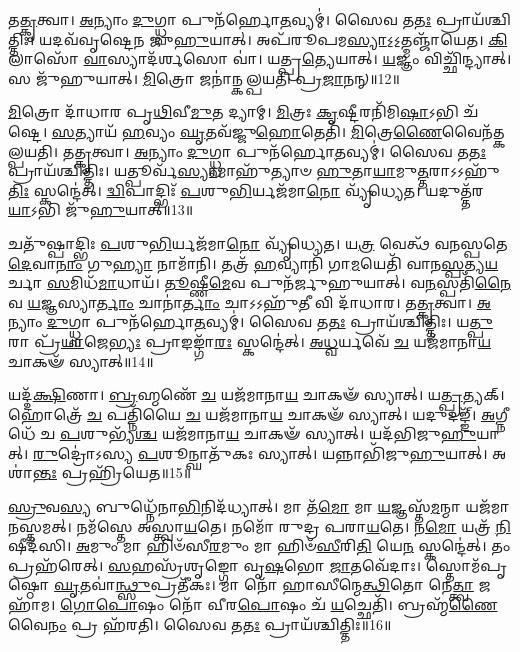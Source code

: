 𑌤\-\ul{𑌤𑍍𑌕𑍃}\-𑌤𑍍𑌵𑌾।
\-\ul{𑌅}\-𑌨𑍍𑌯𑌾𑌂 \ul{𑌦𑍁}\-𑌗𑍍𑌧𑍍𑌵𑌾 𑌪𑍁𑌨᳴𑌰𑍍\mbox{}𑌹𑍋\-\ul{𑌤}\-𑌵𑍍𑌯𑌮𑍍॑।
𑌸𑍈𑌵 𑌤\-\ul{𑌤𑌃} 𑌪𑍍𑌰𑌾𑌯᳴𑌶𑍍𑌚𑌿𑌤𑍍𑌤𑌿𑌃।
𑌯𑌦𑌵᳴𑌵𑍃𑌷𑍍𑌟𑍇𑌨 𑌜𑍁\-\ul{𑌹𑍁}\-𑌯𑌾𑌤𑍍।
𑌅𑌪᳴𑌰𑍂𑌪𑌮\-\ul{𑌸𑍍𑌯𑌾}\-𑌽॒𑌽॒𑌤𑍍𑌮𑌞𑍍𑌜𑌾᳴𑌯𑍇𑌤।
\-\ul{𑌕𑌿}\-𑌲𑌾𑌸𑍋᳴ \ul{𑌵𑌾}\-𑌸𑍍𑌯𑌾𑌦᳴𑌰𑍍\mbox{}\-\ul{𑌶}\-𑌸𑍋 𑌵𑌾॑।
𑌯𑌤𑍍𑌪𑍍𑌰\-\ul{𑌤𑍍𑌯𑍇}\-𑌯𑌾𑌤𑍍।
\-\ul{𑌯}\-𑌜𑍍𑌞𑌂 𑌵𑌿𑌚𑍍𑌛𑌿᳴𑌨𑍍𑌦𑍍𑌯𑌾𑌤𑍍।
𑌸 𑌜𑍁᳴𑌹𑍁𑌯𑌾𑌤𑍍।
\-\ul{𑌮𑌿}\-𑌤𑍍𑌰𑍋 𑌜𑌨𑌾॑𑌨𑍍𑌕𑌲𑍍𑌪𑌯𑌤𑌿 𑌪𑍍𑌰\-\ul{𑌜𑌾}\-𑌨𑌨𑍍॥12॥

\-\ul{𑌮𑌿}\-𑌤𑍍𑌰𑍋 𑌦𑌾᳴𑌧𑌾𑌰 𑌪𑍃\-\ul{𑌥𑌿}\-𑌵𑍀\-\ul{𑌮𑍁}\-𑌤 𑌦𑍍𑌯𑌾𑌮𑍍।
\-\ul{𑌮𑌿}\-𑌤𑍍𑌰𑌃 \ul{𑌕𑍃}\-𑌷𑍍𑌟𑍀𑌰𑌨𑌿᳴𑌮𑌿\-\ul{𑌷𑌾}\-𑌽𑌭𑌿 𑌚᳴𑌷𑍍𑌟𑍇।
\-\ul{𑌸}\-𑌤𑍍𑌯𑌾𑌯᳴ \ul{𑌹}\-𑌵𑍍𑌯𑌂 \ul{𑌘𑍃}\-𑌤𑌵᳴𑌜𑍍𑌜𑍁\-\ul{𑌹𑍋}\-𑌤𑍇𑌤𑌿᳴।
\-\ul{𑌮𑌿}\-𑌤𑍍𑌰𑍇\-\ul{𑌣𑍈}\-𑌵𑍈𑌨᳴𑌤𑍍𑌕𑌲𑍍𑌪𑌯𑌤𑌿।
𑌤\-\ul{𑌤𑍍𑌕𑍃}\-𑌤𑍍𑌵𑌾।
\-\ul{𑌅}\-𑌨𑍍𑌯𑌾𑌂 \ul{𑌦𑍁}\-𑌗𑍍𑌧𑍍𑌵𑌾 𑌪𑍁𑌨᳴𑌰𑍍\mbox{}𑌹𑍋\-\ul{𑌤}\-𑌵𑍍𑌯𑌮𑍍॑।
𑌸𑍈𑌵 𑌤\-\ul{𑌤𑌃} 𑌪𑍍𑌰𑌾𑌯᳴𑌶𑍍𑌚𑌿𑌤𑍍𑌤𑌿𑌃।
𑌯𑌤𑍍𑌪𑍂𑌰𑍍𑌵᳴\-\ul{𑌸𑍍𑌯𑌾}\-𑌮𑌾𑌹𑍁᳴𑌤𑍍𑌯𑌾𑍞 \ul{𑌹𑍁}\-𑌤𑌾\-\ul{𑌯𑌾}\-𑌮𑍁\-\ul{𑌤𑍍𑌤}\-𑌰𑌾\-𑌽𑌽𑌹𑍁᳴\-\ul{𑌤𑌿𑌃} 𑌸𑍍𑌕𑌨𑍍𑌦𑍇॑𑌤𑍍।
\-\ul{𑌦𑍍𑌵𑌿}\-𑌪𑌾𑌦𑍍𑌭𑌿𑌃᳴ \ul{𑌪}\-𑌶𑍁\-\ul{𑌭𑌿}\-𑌰𑍍𑌯𑌜᳴𑌮𑌾\-\ul{𑌨𑍋} 𑌵𑍍𑌯𑍃᳴𑌧𑍍𑌯𑍇𑌤।
𑌯𑌦𑍁𑌤𑍍𑌤᳴𑌰\-\ul{𑌯𑌾}\-𑌽𑌭𑌿 𑌜𑍁᳴\-\ul{𑌹𑍁}\-𑌯𑌾𑌤𑍍॥13॥

𑌚𑌤𑍁᳴𑌷𑍍𑌪𑌾𑌦𑍍𑌭𑌿𑌃 \ul{𑌪}\-𑌶𑍁\-\ul{𑌭𑌿}\-𑌰𑍍𑌯𑌜᳴𑌮𑌾\-\ul{𑌨𑍋} 𑌵𑍍𑌯𑍃᳴𑌧𑍍𑌯𑍇𑌤।
𑌯\-\ul{𑌤𑍍𑌰} 𑌵𑍇𑌤𑍍𑌥᳴ 𑌵𑌨𑌸𑍍𑌪𑌤𑍇 \ul{𑌦𑍇}\-𑌵𑌾\-\ul{𑌨𑌾𑌂} 𑌗𑍁\-\ul{𑌹𑍍𑌯𑌾} 𑌨𑌾𑌮𑌾᳴𑌨𑌿।
𑌤𑌤𑍍𑌰᳴ \ul{𑌹}\-𑌵𑍍𑌯𑌾𑌨𑌿᳴ 𑌗𑌾\-\ul{𑌮}\-𑌯𑍇𑌤𑌿᳴ 𑌵𑌾𑌨\-\ul{𑌸𑍍𑌪}\-𑌤𑍍𑌯\-\ul{𑌯}\-𑌰𑍍𑌚𑌾 \ul{𑌸}\-𑌮𑌿𑌧᳴\-\ul{𑌮𑌾}\-𑌧𑌾𑌯᳴।
\-\ul{𑌤𑍂}\-𑌷𑍍𑌣𑍀\-\ul{𑌮𑍇}\-𑌵 𑌪𑍁𑌨᳴𑌰𑍍𑌜𑍁𑌹𑍁𑌯𑌾𑌤𑍍।
𑌵\-\ul{𑌨}\-𑌸𑍍𑌪𑌤𑌿᳴\-\ul{𑌨𑍈}\-𑌵 \ul{𑌯}\-𑌜𑍍𑌞𑌸𑍍𑌯𑌾\-\ul{𑌰𑍍𑌤𑌾𑌂} 𑌚𑌾𑌨𑌾॑\-\ul{𑌰𑍍𑌤𑌾𑌂} 𑌚𑌾𑌽𑌽𑌹𑍁᳴\-\ul{𑌤𑍀} 𑌵𑌿 𑌦𑌾᳴𑌧𑌾𑌰।
𑌤\-\ul{𑌤𑍍𑌕𑍃}\-𑌤𑍍𑌵𑌾।
\-\ul{𑌅}\-𑌨𑍍𑌯𑌾𑌂 \ul{𑌦𑍁}\-𑌗𑍍𑌧𑍍𑌵𑌾 𑌪𑍁𑌨᳴𑌰𑍍\mbox{}𑌹𑍋\-\ul{𑌤}\-𑌵𑍍𑌯𑌮𑍍॑।
𑌸𑍈𑌵 𑌤\-\ul{𑌤𑌃} 𑌪𑍍𑌰𑌾𑌯᳴𑌶𑍍𑌚𑌿𑌤𑍍𑌤𑌿𑌃।
𑌯\-\ul{𑌤𑍍𑌪𑍁}\-𑌰𑌾 𑌪𑍍𑌰᳴\-\ul{𑌯𑌾}\-𑌜𑍇\-\ul{𑌭𑍍𑌯𑌃} 𑌪𑍍𑌰𑌾𑌙𑌙𑍍𑌗𑌾᳴\-\ul{𑌰𑌃} 𑌸𑍍𑌕𑌨𑍍𑌦𑍇॑𑌤𑍍।
\-\ul{𑌅}\-\-\ul{𑌧𑍍𑌵}\-𑌰𑍍𑌯𑌵𑍇᳴ \ul{𑌚} 𑌯𑌜᳴𑌮𑌾𑌨𑌾\-\ul{𑌯} 𑌚𑌾𑌕𑍟᳴ 𑌸𑍍𑌯𑌾𑌤𑍍॥14॥

𑌯𑌦𑍍𑌦᳴\-\ul{𑌕𑍍𑌷𑌿}\-𑌣𑌾।
\-\ul{𑌬𑍍𑌰}\-𑌹𑍍𑌮𑌣𑍇᳴ \ul{𑌚} 𑌯𑌜᳴𑌮𑌾𑌨𑌾\-\ul{𑌯} 𑌚𑌾𑌕𑍟᳴ 𑌸𑍍𑌯𑌾𑌤𑍍।
𑌯\-\ul{𑌤𑍍𑌪𑍍𑌰}\-𑌤𑍍𑌯𑌕𑍍।
𑌹𑍋𑌤𑍍𑌰𑍇᳴ \ul{𑌚} 𑌪𑌤𑍍𑌨𑌿᳴𑌯𑍈 \ul{𑌚} 𑌯𑌜᳴𑌮𑌾𑌨𑌾\-\ul{𑌯} 𑌚𑌾𑌕𑍟᳴ 𑌸𑍍𑌯𑌾𑌤𑍍।
𑌯𑌦𑍁𑌦𑌙𑍍𑌙𑍍᳴।
\-\ul{𑌅}\-𑌗𑍍𑌨𑍀𑌧𑍇᳴ 𑌚 \ul{𑌪}\-𑌶𑍁𑌭𑍍𑌯᳴\-\ul{𑌶𑍍𑌚} 𑌯𑌜᳴𑌮𑌾𑌨𑌾\-\ul{𑌯} 𑌚𑌾𑌕𑍟᳴ 𑌸𑍍𑌯𑌾𑌤𑍍।
𑌯𑌦᳴𑌭𑌿𑌜𑍁\-\ul{𑌹𑍁}\-𑌯𑌾𑌤𑍍।
\-\ul{𑌰𑍁}\-𑌦𑍍𑌰𑍋॑𑌽𑌸𑍍𑌯 \ul{𑌪}\-𑌶𑍂𑌨𑍍𑌘𑌾𑌤𑍁᳴𑌕𑌃 𑌸𑍍𑌯𑌾𑌤𑍍।
𑌯𑌨𑍍𑌨𑌾𑌭𑌿᳴𑌜𑍁\-\ul{𑌹𑍁}\-𑌯𑌾𑌤𑍍।
𑌅𑌶𑌾॑\-\ul{𑌨𑍍𑌤𑌃} 𑌪𑍍𑌰𑌹𑍍𑌰𑌿᳴𑌯𑍇𑌤॥15॥

\-\ul{𑌸𑍍𑌰𑍁}\-𑌵\-\ul{𑌸𑍍𑌯} 𑌬𑍁𑌧𑍍𑌨𑍇᳴𑌨𑌾\-\ul{𑌭𑌿}\-𑌨𑌿𑌦᳴𑌧𑍍𑌯𑌾𑌤𑍍।
𑌮𑌾 𑌤᳴\-\ul{𑌮𑍋} 𑌮𑌾 \ul{𑌯}\-𑌜𑍍𑌞𑌸𑍍𑌤᳴\-\ul{𑌮}\-𑌨𑍍𑌮𑌾 𑌯𑌜᳴𑌮𑌾𑌨𑌸𑍍𑌤𑌮𑌤𑍍।
𑌨𑌮᳴𑌸𑍍𑌤𑍇 𑌅𑌸𑍍𑌤𑍍𑌵𑌾\-\ul{𑌯}\-𑌤𑍇।
𑌨𑌮𑍋᳴ 𑌰𑍁𑌦𑍍𑌰 𑌪𑌰𑌾\-\ul{𑌯}\-𑌤𑍇।
𑌨\-\ul{𑌮𑍋} 𑌯𑌤𑍍𑌰᳴ \ul{𑌨𑌿}\-𑌷𑍀𑌦᳴𑌸𑌿।
\-\ul{𑌅}\-𑌮𑍁𑌂 𑌮𑌾 𑌹𑌿𑍞᳴𑌸𑍀\-\ul{𑌰}\-𑌮𑍁𑌂 𑌮𑌾 𑌹𑌿𑍞᳴\-\ul{𑌸𑍀}\-𑌰𑌿\-\ul{𑌤𑌿} 𑌯𑍇\-\ul{𑌨} 𑌸𑍍𑌕𑌨𑍍𑌦𑍇॑𑌤𑍍।
𑌤𑌂 𑌪𑍍𑌰𑌹᳴𑌰𑍇𑌤𑍍।
\-\ul{𑌸}\-𑌹𑌸𑍍𑌰᳴𑌶𑍃𑌙𑍍𑌗𑍋 𑌵𑍃\-\ul{𑌷}\-𑌭𑍋 \ul{𑌜𑌾}\-𑌤𑌵𑍇᳴𑌦𑌾𑌃।
𑌸𑍍𑌤𑍋𑌮᳴𑌪𑍃𑌷𑍍𑌠𑍋 \ul{𑌘𑍃}\-𑌤𑌵𑌾॑\-\ul{𑌨𑍍𑌥𑍍𑌸𑍁}\-𑌪𑍍𑌰𑌤𑍀᳴𑌕𑌃।
𑌮𑌾 𑌨𑍋᳴ 𑌹𑌾𑌸𑍀𑌨𑍍𑌮𑍇\-\ul{𑌤𑍍𑌥𑌿}\-𑌤𑍋 𑌨𑍇\-\ul{𑌤𑍍𑌤𑍍𑌵𑌾} 𑌜𑌹𑌾᳴𑌮।
\-\ul{𑌗𑍋}\-\-\ul{𑌪𑍋}\-𑌷𑌂 𑌨𑍋᳴ 𑌵𑍀𑌰\-\ul{𑌪𑍋}\-𑌷𑌂 𑌚᳴ \ul{𑌯}\-𑌚𑍍𑌛𑍇𑌤𑌿᳴।
𑌬𑍍𑌰𑌹𑍍𑌮᳴\-\ul{𑌣𑍈}\-𑌵𑍈\-\ul{𑌨𑌂} 𑌪𑍍𑌰 𑌹᳴𑌰𑌤𑌿।
𑌸𑍈𑌵 𑌤\-\ul{𑌤𑌃} 𑌪𑍍𑌰𑌾𑌯᳴𑌶𑍍𑌚𑌿𑌤𑍍𑌤𑌿𑌃॥16॥

